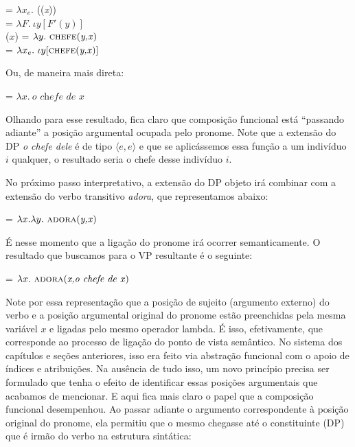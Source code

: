 \begin{exe}
	\ex {} = $\lambda x_{e}.$ ((\textit{x})) \\
	 = $\lambda F.\ \iota y[F'(y)]$  \\
	($x$) = $\lambda y.\ \predica{chefe}{y,x}$ \\
	 = $\lambda x_{e}.\ \iota y[\text{\textsc{chefe}(\textit{y,x})}]$
\end{exe}

\n Ou, de maneira mais direta:

\begin{exe}
	\ex {} = $\lambda x.\ \textit{o chefe de x}$
\end{exe}

\n Olhando para esse resultado, fica claro que composição funcional está ``passando adiante'' a posição argumental ocupada pelo pronome. Note que a extensão do DP \textit{o chefe dele} é de tipo $\langle e,e\rangle$ e que se aplicássemos essa função a um indivíduo $i$ qualquer, o resultado seria o chefe desse indivíduo $i$. 

No próximo passo interpretativo, a extensão do DP objeto irá combinar com a extensão do verbo transitivo \textit{adora}, que representamos abaixo:

\begin{exe}
	\ex {} = $\lambda x.\lambda y.\ \predica{adora}{y,x}$
\end{exe}

\n É nesse momento que a ligação do pronome irá ocorrer semanticamente. O resultado que buscamos para o VP resultante é o seguinte:

\begin{exe}
	\ex {} = $\lambda x.\ \text{\textsc{adora}(\textit{x,o chefe de x})}$
\end{exe}

\n Note por essa representação que a posição de sujeito (argumento externo) do verbo e a posição argumental original do pronome estão preenchidas pela mesma variável $x$ e ligadas pelo mesmo operador lambda. É isso, efetivamente, que corresponde ao processo de ligação do ponto de vista semântico. No sistema dos capítulos e seções anteriores, isso era feito via abstração funcional com o apoio de índices e atribuições. Na ausência de tudo isso, um novo princípio precisa ser formulado que tenha o efeito de identificar essas posições argumentais que acabamos de mencionar. E aqui fica mais claro o papel que a composição funcional desempenhou. Ao passar adiante o argumento correspondente à posição original do pronome, ela permitiu que o mesmo chegasse até o constituinte (DP) que é irmão do verbo na estrutura sintática:



